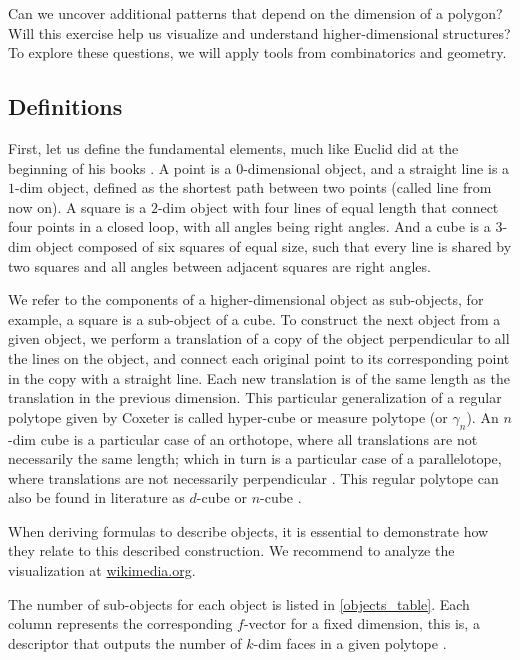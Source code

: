 \documentclass{article}
\begin{document}
	Can we uncover additional patterns that depend on the dimension of a polygon? Will this exercise help us visualize and understand higher-dimensional structures? To explore these questions, we will apply tools from combinatorics and geometry.

	
	\subsection{Definitions \label{sec:def}}
	
	First, let us define the fundamental elements, much like Euclid did at the beginning of his books \cite{euclid}. A point is a $0$-dimensional object, and a straight line is a $1$-dim object, defined as the shortest path between two points (called line from now on). A square is a $2$-dim object with four lines of equal length that connect four points in a closed loop, with all angles being right angles. And a cube is a $3$-dim object composed of six squares of equal size, such that every line is shared by two squares and all angles between adjacent squares are right angles.
	
	We refer to the components of a higher-dimensional object as sub-objects, for example, a square is a sub-object of a cube. To construct the next object from a given object, we perform a translation of a copy of the object perpendicular to all the lines on the object, and connect each original point to its corresponding point in the copy with a straight line. Each new translation is of the same length as the translation in the previous dimension. This particular generalization of a regular polytope given by Coxeter \cite{coxeter1973regular} is called hyper-cube or measure polytope (or $\gamma_n$). An $n$-dim cube is a particular case of an orthotope, where all translations are not necessarily the same length; which in turn is a particular case of a parallelotope, where translations are not necessarily perpendicular \cite{coxeter1973regular}. This regular polytope can also be found in literature as $d$-cube or $n$-cube \cite{zieglerLectures}.
	
	When deriving formulas to describe objects, it is essential to demonstrate how they relate to this described construction. We recommend to analyze the visualization at \href{https://commons.wikimedia.org/wiki/File:From_Point_to_Tesseract_(Looped_Version).gif}{wikimedia.org}.
	
	The number of sub-objects for each object is listed in \autoref{objects_table}. Each column represents the corresponding $f$-vector for a fixed dimension, this is, a descriptor that outputs the number of $k$-dim faces in a given polytope \cite{zieglerLectures}.
	
\end{document}
